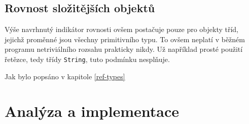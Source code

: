 \section{Rovnost složitějších objektů}
Výše navrhnutý indikátor rovnosti ovšem postačuje pouze pro objekty tříd, jejichž proměnné jsou všechny primitivního typu. To ovšem neplatí v běžném programu netriviálního rozsahu prakticky nikdy. Už například prosté použití řetězce, tedy třídy \texttt{String}, tuto podmínku nesplňuje.

Jak bylo popsáno v kapitole \ref{ref-types}


\chapter{Analýza a implementace}
